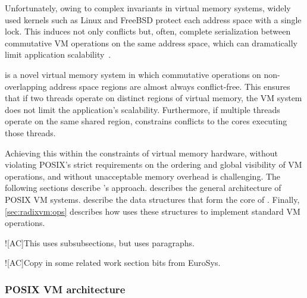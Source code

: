Unfortunately, owing to complex invariants in virtual memory systems,
widely used kernels such as Linux and FreeBSD protect each address
space with a single lock.  This induces not only conflicts but, often,
complete serialization between commutative VM operations on the same
address space, which can dramatically limit application
scalability~\cite{boyd-wickizer:scaling,clements:bonsai}.

\vm is a novel virtual memory system in which commutative operations
on non-overlapping address space regions are almost always
conflict-free.  This ensures that if two threads operate on distinct
regions of virtual memory, the VM system does not limit the
application's scalability.  Furthermore, if multiple threads operate
on the same shared region, \vm constrains conflicts to the cores
executing those threads.

Achieving this within the constraints of virtual memory hardware,
without violating POSIX's strict requirements on the ordering and
global visibility of VM operations, and without unacceptable memory
overhead is challenging.  The following sections describe \vm's
approach.   describes the general architecture
of POSIX VM systems.   describe
the data structures that form the core of \vm.  Finally,
\cref{sec:radixvm:ops} describes how \vm uses these structures to
implement standard VM operations.



\XXX![AC]{This uses subsubsections, but  uses paragraphs.}

\XXX![AC]{Copy in some related work section bits from EuroSys.}

\subsubsection{POSIX VM architecture}
\label{sec:radixvm:arch}

